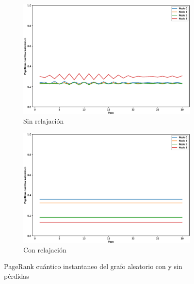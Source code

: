 \documentclass[xetex,mathserif,serif]{beamer}
\begin{document}
\begin{frame}
\begin{figure}[H]
    \centering
    \begin{subfigure}[m]{0.45\textwidth}
        \centering
        \includegraphics[width=0.9\linewidth]{img/crown-inst-lossless.eps}
        \caption{Sin relajación}
    \end{subfigure}
    \begin{subfigure}[m]{0.45\textwidth}
        \centering
        \includegraphics[width=0.9\linewidth]{img/crown-inst-lossy.eps}
        \caption{Con relajación}
    \end{subfigure}
    \caption[PageRank cuántico instantaneo del grafo aleatorio con y sin pérdidas]{PageRank cuántico instantaneo del grafo aleatorio con y sin pérdidas}
    \label{fig:instcrownlossy}
\end{figure}


\end{frame}
\end{document}
